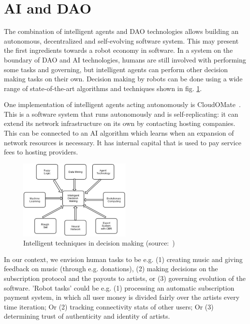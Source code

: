 \section{AI and DAO}
The combination of intelligent agents and DAO technologies allows building an autonomous, decentralized and self-evolving software system. This may present the first ingredients towards a robot economy in software. In a system on the boundary of DAO and AI technologies, humans are still involved with performing some tasks and governing, but intelligent agents can perform other decision making tasks on their own. Decision making by robots can be done using a wide range of state-of-the-art algorithms and techniques shown in fig. \ref{fig:ai-techniques}.

One implementation of intelligent agents acting autonomously is CloudOMate~\citep{jaspers2018plebnet}. This is a software system that runs autonomously and is self-replicating: it can extend its network infrastructure on its own by contacting hosting companies. This can be connected to an AI algorithm which learns when an expansion of network resources is necessary. It has internal capital that is used to pay service fees to hosting providers.

\begin{figure}
    \centering
    \includegraphics[width=0.5\textwidth]{related-work/intelligent-decision-making.png}
    \caption{Intelligent techniques in decision making (source:~\cite{das2016intelligent})}
    \label{fig:ai-techniques}
\end{figure}

In our context, we envision human tasks to be e.g. (1) creating music and giving feedback on music (through e.g. donations), (2) making decisions on the subscription protocol and the payouts to artists, or (3) governing evolution of the software. 'Robot tasks' could be e.g. (1) processing an automatic subscription payment system, in which all user money is divided fairly over the artists every time iteration; Or (2) tracking connectivity stats of other users; Or (3) determining trust of authenticity and identity of artists.

